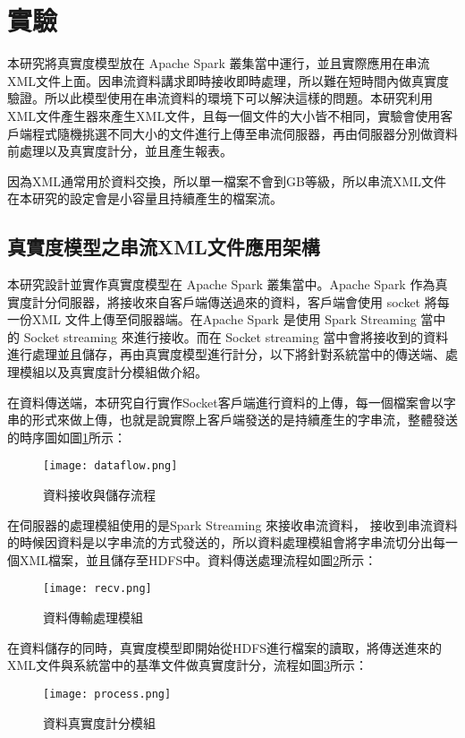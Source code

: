 \section{實驗}
本研究將真實度模型放在 Apache Spark 叢集當中運行，並且實際應用在串流XML文件上面。因串流資料講求即時接收即時處理，所以難在短時間內做真實度驗證。所以此模型使用在串流資料的環境下可以解決這樣的問題。本研究利用XML文件產生器\cite{xmlgen}來產生XML文件，且每一個文件的大小皆不相同，實驗會使用客戶端程式隨機挑選不同大小的文件進行上傳至串流伺服器，再由伺服器分別做資料前處理以及真實度計分，並且產生報表。\\\par
因為XML通常用於資料交換，所以單一檔案不會到GB等級，所以串流XML文件在本研究的設定會是小容量且持續產生的檔案流。
\subsection{真實度模型之串流XML文件應用架構}
本研究設計並實作真實度模型在 Apache Spark 叢集當中。Apache Spark 作為真實度計分伺服器，將接收來自客戶端傳送過來的資料，客戶端會使用 socket 將每一份XML 文件上傳至伺服器端。在Apache Spark 是使用 Spark Streaming 當中的 Socket streaming 來進行接收。而在 Socket streaming 當中會將接收到的資料進行處理並且儲存，再由真實度模型進行計分，以下將針對系統當中的傳送端、處理模組以及真實度計分模組做介紹。\\\par

在資料傳送端，本研究自行實作Socket客戶端進行資料的上傳，每一個檔案會以字串的形式來做上傳，也就是說實際上客戶端發送的是持續產生的字串流，整體發送的時序圖如圖\ref{dataflow}所示：
\begin{figure}[H]
\centering
\graphicspath{{/Users/FUDA/Documents/masterThesis/image/}}
\texttt{[image: dataflow.png]}
\caption{資料接收與儲存流程}
\label{dataflow}
\end{figure}

在伺服器的處理模組使用的是Spark Streaming 來接收串流資料， 接收到串流資料的時候因資料是以字串流的方式發送的，所以資料處理模組會將字串流切分出每一個XML檔案，並且儲存至HDFS中。資料傳送處理流程如圖\ref{recv}所示：
\begin{figure}[H]
\centering
\graphicspath{{/Users/FUDA/Documents/masterThesis/image/}}
\texttt{[image: recv.png]}
\caption{資料傳輸處理模組}
\label{recv}
\end{figure}
在資料儲存的同時，真實度模型即開始從HDFS進行檔案的讀取，將傳送進來的XML文件與系統當中的基準文件做真實度計分，流程如圖\ref{process}所示：
\begin{figure}[H]
\centering
\graphicspath{{/Users/FUDA/Documents/masterThesis/image/}}
\texttt{[image: process.png]}
\caption{資料真實度計分模組}
\label{process}
\end{figure}

